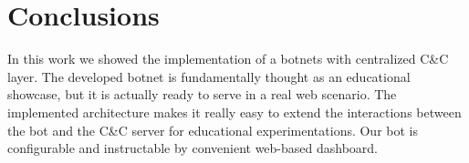 \section{Conclusions}
\label{sec:conclusions}

In this work we showed the implementation of a botnets with centralized C\&C layer. The developed botnet is fundamentally thought as an educational showcase, but it is actually ready to serve in a real web scenario.
The implemented architecture makes it really easy to extend the interactions between the bot and the C\&C server for educational experimentations.
Our bot is configurable and instructable by convenient web-based dashboard.
